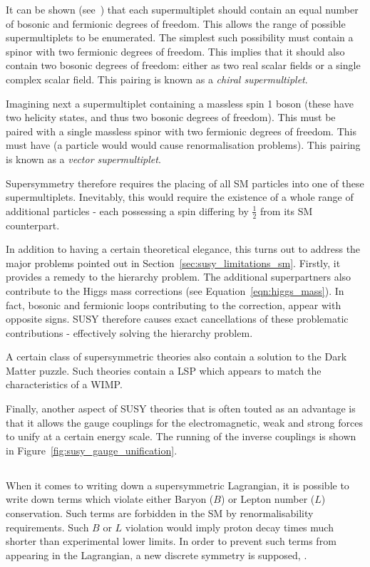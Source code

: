 It can be shown (see~\cite{susy_primer}) that each supermultiplet should contain
an equal number of bosonic and fermionic degrees of freedom. This allows the
range of possible supermultiplets to be enumerated. The simplest such
possibility must contain a spinor with two fermionic degrees of freedom. This
implies that it should also contain two bosonic degrees of freedom: either as
two real scalar fields or a single complex scalar field. This pairing is known
as a \emph{chiral supermultiplet}.

Imagining next a supermultiplet containing a massless spin 1 boson (these have
two helicity states, and thus two bosonic degrees of freedom). This must be
paired with a single massless spinor with two fermionic degrees of freedom. This
must have \spinhalf (a \spinthreetwo particle would would cause renormalisation
problems). This pairing is known as a \emph{vector supermultiplet}.

Supersymmetry therefore requires the placing of all \ac{SM} particles into one
of these supermultiplets. Inevitably, this would require the existence of a
whole range of additional particles - each possessing a spin differing by
$\frac{1}{2}$ from its \ac{SM} counterpart.

In addition to having a certain theoretical elegance, this turns out to address
the major problems pointed out in
Section~\ref{sec:susy_limitations_sm}. Firstly, it provides a remedy to the
hierarchy problem. The additional superpartners also contribute to the Higgs
mass corrections (see Equation~\ref{eqn:higgs_mass}). In fact, bosonic and
fermionic loops contributing to the correction, appear with opposite
signs. \acl{SUSY} therefore causes exact cancellations of these problematic
contributions - effectively solving the hierarchy problem.

A certain class of supersymmetric theories also contain a solution to the Dark
Matter puzzle. Such theories contain a \acl{LSP} which appears to match the
characteristics of a \ac{WIMP}.

Finally, another aspect of \ac{SUSY} theories that is often touted as an
advantage is that it allows the gauge couplings for the electromagnetic, weak
and strong forces to unify at a certain energy scale. The running of the inverse
couplings is shown in Figure~\ref{fig:susy_gauge_unification}.

\subsection[R-Parity]{\Rparity}
When it comes to writing down a supersymmetric Lagrangian, it is possible to
write down terms which violate either Baryon ($B$) or Lepton number ($L$)
conservation. Such terms are forbidden in the \ac{SM} by renormalisability
requirements. Such $B$ or $L$ violation would imply proton decay times much
shorter than experimental lower limits. In order to prevent such terms from
appearing in the Lagrangian, a new discrete symmetry is supposed, \Rparity.

